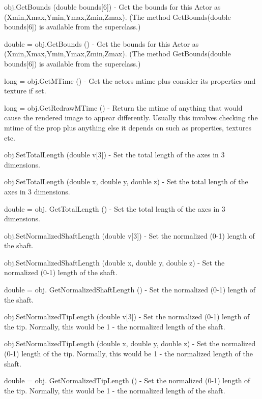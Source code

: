 \begin{DoxyItemize}
\item {\ttfamily obj.\-Get\-Bounds (double bounds\mbox{[}6\mbox{]})} -\/ Get the bounds for this Actor as (Xmin,Xmax,Ymin,Ymax,Zmin,Zmax). (The method Get\-Bounds(double bounds\mbox{[}6\mbox{]}) is available from the superclass.)  
\item {\ttfamily double = obj.\-Get\-Bounds ()} -\/ Get the bounds for this Actor as (Xmin,Xmax,Ymin,Ymax,Zmin,Zmax). (The method Get\-Bounds(double bounds\mbox{[}6\mbox{]}) is available from the superclass.)  
\item {\ttfamily long = obj.\-Get\-M\-Time ()} -\/ Get the actors mtime plus consider its properties and texture if set.  
\item {\ttfamily long = obj.\-Get\-Redraw\-M\-Time ()} -\/ Return the mtime of anything that would cause the rendered image to appear differently. Usually this involves checking the mtime of the prop plus anything else it depends on such as properties, textures etc.  
\item {\ttfamily obj.\-Set\-Total\-Length (double v\mbox{[}3\mbox{]})} -\/ Set the total length of the axes in 3 dimensions.  
\item {\ttfamily obj.\-Set\-Total\-Length (double x, double y, double z)} -\/ Set the total length of the axes in 3 dimensions.  
\item {\ttfamily double = obj. Get\-Total\-Length ()} -\/ Set the total length of the axes in 3 dimensions.  
\item {\ttfamily obj.\-Set\-Normalized\-Shaft\-Length (double v\mbox{[}3\mbox{]})} -\/ Set the normalized (0-\/1) length of the shaft.  
\item {\ttfamily obj.\-Set\-Normalized\-Shaft\-Length (double x, double y, double z)} -\/ Set the normalized (0-\/1) length of the shaft.  
\item {\ttfamily double = obj. Get\-Normalized\-Shaft\-Length ()} -\/ Set the normalized (0-\/1) length of the shaft.  
\item {\ttfamily obj.\-Set\-Normalized\-Tip\-Length (double v\mbox{[}3\mbox{]})} -\/ Set the normalized (0-\/1) length of the tip. Normally, this would be 1 -\/ the normalized length of the shaft.  
\item {\ttfamily obj.\-Set\-Normalized\-Tip\-Length (double x, double y, double z)} -\/ Set the normalized (0-\/1) length of the tip. Normally, this would be 1 -\/ the normalized length of the shaft.  
\item {\ttfamily double = obj. Get\-Normalized\-Tip\-Length ()} -\/ Set the normalized (0-\/1) length of the tip. Normally, this would be 1 -\/ the normalized length of the shaft.  

\end{DoxyItemize}
